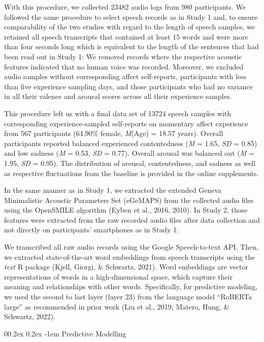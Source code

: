 \documentclass[
  man,floatsintext]{apa6}
\makeatletter
\let\oldparagraph\paragraph
\renewcommand{\paragraph}[1]{\oldparagraph{#1}\mbox{}}
\renewcommand{\paragraph}{\@startsection{paragraph}{4}{\parindent}%
  {0\baselineskip \@plus 0.2ex \@minus 0.2ex}%
  {-1em}%
  {\normalfont\normalsize\bfseries\itshape\typesectitle}}
\makeatother
\begin{document}
With this procedure, we collected 23482 audio logs from 980 participants. We followed the same procedure to select speech records as in Study 1 and, to ensure comparability of the two studies with regard to the length of speech samples, we retained all speech transcripts that contained at least 15 words and were more than four seconds long which is equivalent to the length of the sentences that had been read out in Study 1: We removed records where the respective acoustic features indicated that no human voice was recorded. Moreover, we excluded audio samples without corresponding affect self-reports, participants with less than five experience sampling days, and those participants who had no variance in all their valence and arousal scores across all their experience samples.

This procedure left us with a final data set of 13724 speech samples with corresponding experience-sampled self-reports on momentary affect experience from 567 participants (64.90\% female, \emph{M}(Age) = 18.57 years). Overall participants reported balanced experienced contentedness (\emph{M} = 1.65, \emph{SD} = 0.85) and low sadness (\emph{M} = 0.53, \emph{SD} = 0.77). Overall arousal was balanced out (\emph{M} = 1.95, \emph{SD} = 0.95). The distribution of arousal, contentedness, and sadness as well as respective fluctuations from the baseline is provided in the online supplements.

In the same manner as in Study 1, we extracted the extended Geneva Minimalistic Acoustic Parameters Set (eGeMAPS) from the collected audio files using the OpenSMILE algorithm (Eyben et al., 2016, 2010). In Study 2, those features were extracted from the raw recorded audio files after data collection and not directly on participants' smartphones as in Study 1.

We transcribed all raw audio records using the Google Speech-to-text API. Then, we extracted state-of-the-art word embeddings from speech transcripts using the \emph{text} R package (Kjell, Giorgi, \& Schwartz, 2021). Word embeddings are vector representations of words in a high-dimensional space, which capture their meaning and relationships with other words. Specifically, for predictive modeling, we used the second to last layer (layer 23) from the language model ``RoBERTa large'' as recommended in prior work (Liu et al., 2019; Matero, Hung, \& Schwartz, 2022).

\hypertarget{predictive-modelling-1}{%
\paragraph{Predictive Modelling}\label{predictive-modelling-1}}
\end{document}
